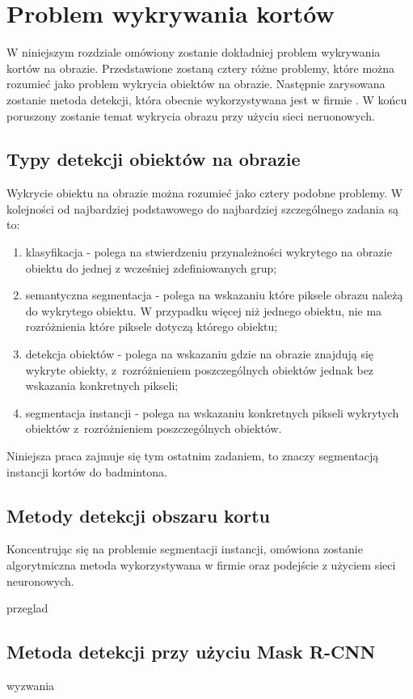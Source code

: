 \chapter{Problem wykrywania kortów}

W niniejszym rozdziale omówiony zostanie dokładniej problem wykrywania kortów na obrazie.
Przedstawione zostaną cztery różne problemy, które można rozumieć jako problem wykrycia obiektów na obrazie.
Następnie zarysowana zostanie metoda detekcji, która obecnie wykorzystywana jest w firmie \blue.
W końcu poruszony zostanie temat wykrycia obrazu przy użyciu sieci neruonowych.

\section{Typy detekcji obiektów na obrazie}
\label{sec:typy_detekcji}

Wykrycie obiektu na obrazie można rozumieć jako cztery podobne problemy.
W kolejności od najbardziej podstawowego do najbardziej szczególnego zadania są to:

\begin{enumerate}
	\item klasyfikacja - polega na stwierdzeniu przynależności wykrytego na obrazie obiektu do jednej z wcześniej zdefiniowanych grup;
  \item semantyczna segmentacja - polega na wskazaniu które piksele obrazu należą do wykrytego obiektu.
        W przypadku więcej niż jednego obiektu, nie ma rozróżnienia które piksele dotyczą którego obiektu;
	\item detekcja obiektów - polega na wskazaniu gdzie na obrazie znajdują się wykryte obiekty, z~rozróżnieniem poszczególnych obiektów jednak bez wskazania konkretnych pikseli;
	\item segmentacja instancji - polega na wskazaniu konkretnych pikseli wykrytych obiektów z~rozróżnieniem poszczególnych obiektów.
\end{enumerate}

Niniejsza praca zajmuje się tym ostatnim zadaniem, to znaczy segmentacją instancji kortów do badmintona.

\section{Metody detekcji obszaru kortu}
\label{sec:metody_detekcji}

Koncentrując się na problemie segmentacji instancji, omówiona zostanie algorytmiczna metoda wykorzystywana w firmie \blue oraz podejście z użyciem sieci neuronowych. \\


{przeglad}

\section{Metoda detekcji przy użyciu Mask R-CNN}
{wyzwania}
